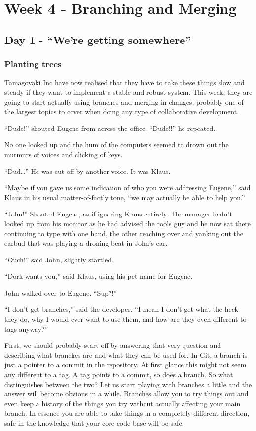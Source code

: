 \cleardoublepage
\chapter{Week 4 - Branching and Merging}
\section{Day 1 - ``We're getting somewhere''}
\subsection{Planting trees}
Tamagoyaki Inc have now realised that they have to take these things slow and steady if they want to implement a stable and robust system.
This week, they are going to start actually using branches and merging in changes, probably one of the largest topics to cover when doing any type of collaborative development.

\begin{trenches}
``Dude!'' shouted Eugene from across the office.
``Dude!!'' he repeated.

No one looked up and the hum of the computers seemed to drown out the murmurs of voices and clicking of keys.

``Dud\ldots''
He was cut off by another voice.
It was Klaus.

``Maybe if you gave us some indication of who you were addressing Eugene,'' said Klaus in his usual matter-of-factly tone,
``we may actually be able to help you.''

``John!'' Shouted Eugene, as if ignoring Klaus entirely.
The manager hadn't looked up from his monitor as he had advised the tools guy and he now sat there continuing to type with one hand, the other reaching over and yanking out the earbud that was playing a droning beat in John's ear.

``Ouch!'' said John, slightly startled.

``Dork wants you,'' said Klaus, using his pet name for Eugene.

John walked over to Eugene.
``Sup?!''

``I don't get branches,'' said the developer.
``I mean I don't get what the heck they do, why I would ever want to use them, and how are they even different to tags anyway?''
\end{trenches}

First, we should probably start off by answering that very question and describing what branches are and what they can be used for.
In Git, a branch is just a pointer to a commit in the repository.
At first glance this might not seem any different to a tag.
A tag points to a commit, so does a branch.
So what distinguishes between the two? Let us start playing with branches a little and the answer will become obvious in a while.
Branches allow you to try things out and even keep a history of the things you try without actually affecting your main branch.
In essence you are able to take things in a completely different direction, safe in the knowledge that your core code base will be safe.

